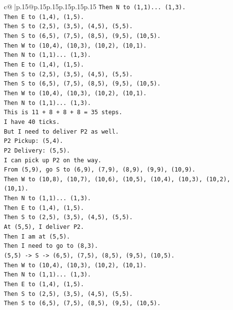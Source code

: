 \documentclass{article}
\begin{document}
{\begin{supertabular}{c@{$\;$}|p{.15\linewidth}@{}p{.15\linewidth}p{.15\linewidth}p{.15\linewidth}p{.15\linewidth}p{.15\linewidth}}
{{{\texttt{Then N to (1,1)... (1,3).} \\
\texttt{Then E to (1,4), (1,5).} \\
\texttt{Then S to (2,5), (3,5), (4,5), (5,5).} \\
\texttt{Then S to (6,5), (7,5), (8,5), (9,5), (10,5).} \\
\texttt{Then W to (10,4), (10,3), (10,2), (10,1).} \\
\texttt{Then N to (1,1)... (1,3).} \\
\texttt{Then E to (1,4), (1,5).} \\
\texttt{Then S to (2,5), (3,5), (4,5), (5,5).} \\
\texttt{Then S to (6,5), (7,5), (8,5), (9,5), (10,5).} \\
\texttt{Then W to (10,4), (10,3), (10,2), (10,1).} \\
\texttt{Then N to (1,1)... (1,3).} \\
\texttt{This is 11 + 8 + 8 + 8 = 35 steps.} \\
\texttt{I have 40 ticks.} \\
\texttt{But I need to deliver P2 as well.} \\
\texttt{P2 Pickup: (5,4).} \\
\texttt{P2 Delivery: (5,5).} \\
\texttt{I can pick up P2 on the way.} \\
\texttt{From (5,9), go S to (6,9), (7,9), (8,9), (9,9), (10,9).} \\
\texttt{Then W to (10,8), (10,7), (10,6), (10,5), (10,4), (10,3), (10,2), (10,1).} \\
\texttt{Then N to (1,1)... (1,3).} \\
\texttt{Then E to (1,4), (1,5).} \\
\texttt{Then S to (2,5), (3,5), (4,5), (5,5).} \\
\texttt{At (5,5), I deliver P2.} \\
\texttt{Then I am at (5,5).} \\
\texttt{Then I need to go to (8,3).} \\
\texttt{(5,5) {-}> S {-}> (6,5), (7,5), (8,5), (9,5), (10,5).} \\
\texttt{Then W to (10,4), (10,3), (10,2), (10,1).} \\
\texttt{Then N to (1,1)... (1,3).} \\
\texttt{Then E to (1,4), (1,5).} \\
\texttt{Then S to (2,5), (3,5), (4,5), (5,5).} \\
\texttt{Then S to (6,5), (7,5), (8,5), (9,5), (10,5).} \\
}}}
\end{supertabular}}
\end{document}
